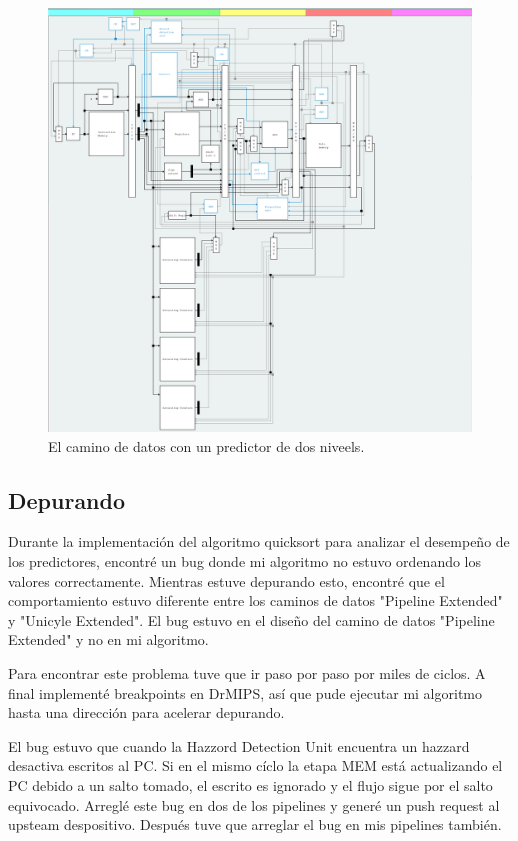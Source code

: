 \documentclass[a4paper]{article}
\begin{document}
\begin{figure}[!htb]
\centering
\includegraphics[scale=0.4]{./img/two_level_drmips}
\caption{El camino de datos con un predictor de dos niveels.}
\label{fig:two_level_drmips}
\end{figure}

\subsection{Depurando}

Durante la implementación del algoritmo quicksort para analizar el desempeño de los predictores, encontré un bug donde mi algoritmo no estuvo ordenando los valores correctamente. Mientras estuve depurando esto, encontré que el comportamiento estuvo diferente entre los caminos de datos "Pipeline Extended" y "Unicyle Extended". El bug estuvo en el diseño del camino de datos "Pipeline Extended" y no en mi algoritmo.

Para encontrar este problema tuve que ir paso por paso por miles de ciclos. A final implementé breakpoints en DrMIPS, así que pude ejecutar mi algoritmo hasta una dirección para acelerar depurando.

El bug estuvo que cuando la Hazzord Detection Unit encuentra un hazzard desactiva escritos al PC. Si en el mismo cíclo la etapa MEM está actualizando el PC debido a un salto tomado, el escrito es ignorado y el flujo sigue por el salto equivocado. Arreglé este bug en dos de los pipelines y generé un push request al upsteam despositivo. Después tuve que arreglar el bug en mis pipelines también.
\end{document}
